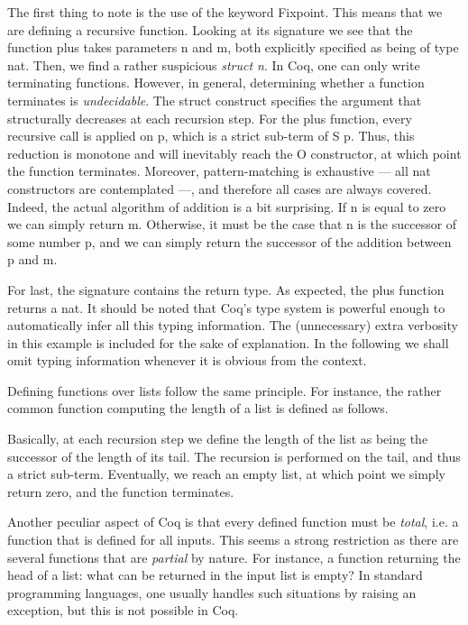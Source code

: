 	\noindent The first thing to note is the use of the keyword \textsf{Fixpoint}. This
	 means that we are defining a recursive function. Looking at its signature
	 we see that the function \textsf{plus} takes parameters \textsf{n} and
	 \textsf{m}, both explicitly specified as being of type \textsf{nat}.
     Then, we find a rather suspicious \textit{\textbraceleft struct n\textbraceright}.	
	In Coq, one can only write terminating functions. However, in general, determining
	whether a function terminates is \textit{undecidable}. The \textsf{struct} construct
	specifies the argument that structurally decreases at each recursion step. For the
	\textsf{plus} function, every recursive call is applied on \textsf{p}, which is a strict
	sub-term of \textsf{S p}. Thus, this reduction is monotone and will inevitably reach
	the \textsf{O} constructor, at which point the function terminates. Moreover,
	pattern-matching is exhaustive --- all \textsf{nat} constructors are contemplated ---,
	and therefore all cases are always covered. Indeed, the actual algorithm of addition
	is a bit surprising. If \textsf{n} is equal to zero we can simply return \textsf{m}. Otherwise,
	it must be the case that \textsf{n} is the successor of some number \textsf{p},
	and we can simply return the successor of the addition between \textsf{p} and
	\textsf{m}.	
	
	For last, the signature contains the return type. As expected, the \textsf{plus} function 
	returns a \textsf{nat}.
	 It should be noted that Coq's type system is powerful enough to automatically
	infer all this typing information. The (unnecessary) extra verbosity in this 
	example is included for the sake of explanation. In the following we shall omit 
	typing information whenever it is obvious from the context.
	
	Defining functions over lists follow the same principle. For instance, the rather
	common function computing the length of a list is defined as follows.
	
		

	\noindent Basically, at each recursion step we define the length of the list
	as being the successor of the length of its tail. The recursion is performed
	on the tail, and thus a strict sub-term. Eventually, we reach an empty list,
	at which point we simply return zero, and the function terminates. 
	
	
	
	Another peculiar aspect of Coq is that every defined function must be \textit{total}, i.e.
	a function that is defined for all inputs. This seems a strong restriction as there are several
	functions that are \textit{partial} by nature. For instance, a function returning the head of a list:
	what can be returned in the input list is empty? In standard programming languages, one
	usually handles such situations by raising an exception, but this is not possible in Coq.
		
